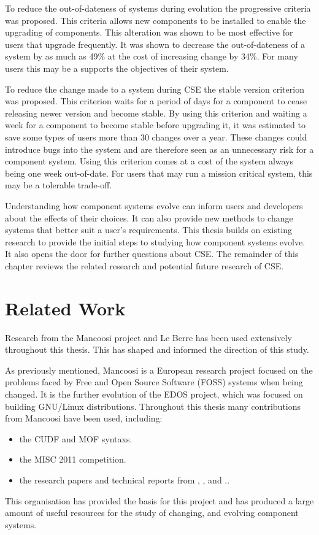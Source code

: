 To reduce the out-of-dateness of systems during evolution the progressive criteria was proposed.
This criteria allows new components to be installed to enable the upgrading of components.
This alteration was shown to be most effective for users that upgrade frequently.
It was shown to decrease the out-of-dateness of a system by as much as 49\% at the cost of increasing change by 34\%.
For many users this may be a supports the objectives of their system.

To reduce the change made to a system during CSE the stable version criterion was proposed.
This criterion waits for a period of days for a component to cease releasing newer version and become stable.
By using this criterion and waiting a week for a component to become stable before upgrading it, it was estimated to save some types of users more than 30 changes over a year.
These changes could introduce bugs into the system and are therefore seen as an unnecessary risk for a component system. 
Using this criterion comes at a cost of the system always being one week out-of-date.
For users that may run a mission critical system, this may be a tolerable trade-off.

Understanding how component systems evolve can inform users and developers about the effects of their choices.
It can also provide new methods to change systems that better suit a user's requirements.
This thesis builds on existing research to provide the initial steps to studying how component systems evolve.
It also opens the door for further questions about CSE.
The remainder of this chapter reviews the related research and potential future research of CSE.  

\section{Related Work}
Research from the Mancoosi project and Le Berre has been used extensively throughout this thesis.
This has shaped and informed the direction of this study.

As previously mentioned,
Mancoosi is a European research project focused on the problems faced by Free and Open Source Software (FOSS) systems when being changed.
It is the further evolution of the EDOS project, which was focused on building GNU/Linux distributions.
Throughout this thesis many contributions from Mancoosi have been used, including:
\begin{itemize}
  \item the CUDF \citep{treinen2009common} and MOF syntaxs.
  \item the MISC 2011 competition.
  \item the research papers and technical reports from \cite{abatetrenen2010}, \cite{Treinen2009}, \cite{argelich2010solving} and \cite{abate2011}..
\end{itemize} 
This organisation has provided the basis for this project and has produced a large amount of useful resources for the study of changing, and evolving component systems. 

